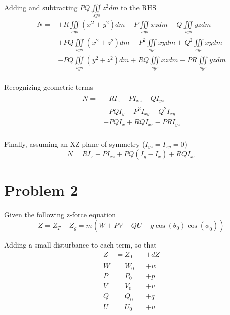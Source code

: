 \documentclass[a4paper]{article}
\begin{document}
\noindent Adding and subtracting $ P Q \iiint\limits_{sys} z^2 dm $ to the RHS
\begin{equation*}
\begin{split}
N =  & + \dot{R} \iiint\limits_{sys} (x^2 + y^2) dm
            - \dot{P} \iiint\limits_{sys} x z dm
            - \dot{Q} \iiint\limits_{sys} y z dm \\
     &      +     P Q \iiint\limits_{sys} (x^2 + z^2) dm 
            -     P^2 \iiint\limits_{sys} x y dm 
            +     Q^2 \iiint\limits_{sys} x y dm \\
     &      -     P Q \iiint\limits_{sys} (y^2 + z^2) dm 
            +     R Q \iiint\limits_{sys} x z dm 
            -     P R \iiint\limits_{sys} y z dm \\
\end{split}
\end{equation*}

\noindent Recognizing geometric terms
\begin{equation*}
\begin{split}
N = & +\dot{R} I_z
    - \dot{P} I_{x z}
    - \dot{Q} I_{y z} \\
    & + P Q I_{y} 
      - P^2 I_{x y} 
      + Q^2 I_{x y} \\
    & - P Q I_{x} 
      + R Q I_{x z} 
      - P R I_{y z} \\
\end{split}
\end{equation*}

\noindent Finally, assuming an XZ plane of symmetry ($I_{yz} = I_{xy} = 0$)
\begin{equation*}
N =     \dot{R} I_z
      - \dot{P} I_{x z}
      + P Q (I_{y} - I_{x}) 
      + R Q I_{x z} 
\end{equation*}

\section{Problem 2}
\noindent Given the following z-force equation
\begin{equation*}
Z = Z_T - Z_g = m (\dot{W} + PV - QU - g\cos(\theta_0)\cos(\phi_0))
\end{equation*}

\noindent Adding a small disturbance to each term, so that
\begin{equation*}
\begin{alignedat}{2}
Z &= Z_0 & &+ dZ \\
\dot{W} &= \dot{W_0} & &+ \dot{w} \\
P &= P_0 & &+ p \\
V &= V_0 & &+ v \\
Q &= Q_0 & &+ q \\
U &= U_0 & &+ u \\
\end{alignedat}
\end{equation*}
\end{document}

